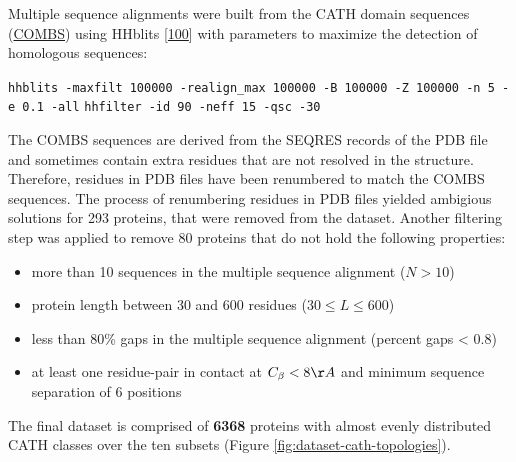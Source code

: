 \documentclass[12pt,a4paper,twoside]{book}
\providecommand{\tightlist}{%
  \setlength{\itemsep}{0pt}\setlength{\parskip}{0pt}}
\theoremstyle{definition}
\theoremstyle{definition}
\theoremstyle{remark}
\begin{document}
Multiple sequence alignments were built from the CATH domain sequences
(\href{http://www.cathdb.info/version/current/domain/3cdjA03/sequence}{COMBS})
using HHblits {[}\protect\hyperlink{ref-Remmert2012}{100}{]} with
parameters to maximize the detection of homologous sequences:

\texttt{hhblits\ -maxfilt\ 100000\ -realign\_max\ 100000\ -B\ 100000\ -Z\ 100000\ -n\ 5\ -e\ 0.1\ -all}
\texttt{hhfilter\ -id\ 90\ -neff\ 15\ -qsc\ -30}

The COMBS sequences are derived from the SEQRES records of the PDB file
and sometimes contain extra residues that are not resolved in the
structure. Therefore, residues in PDB files have been renumbered to
match the COMBS sequences. The process of renumbering residues in PDB
files yielded ambigious solutions for 293 proteins, that were removed
from the dataset. Another filtering step was applied to remove 80
proteins that do not hold the following properties:

\begin{itemize}
\tightlist
\item
  more than 10 sequences in the multiple sequence alignment (\(N>10\))
\item
  protein length between 30 and 600 residues (\(30 \leq L \leq 600\))
\item
  less than 80\% gaps in the multiple sequence alignment (percent gaps
  \textless{} 0.8)
\item
  at least one residue-pair in contact at \(C_\beta < 8\AA\) and minimum
  sequence separation of 6 positions
\end{itemize}

The final dataset is comprised of \textbf{6368} proteins with almost
evenly distributed CATH classes over the ten subsets (Figure
\ref{fig:dataset-cath-topologies}).
\end{document}

